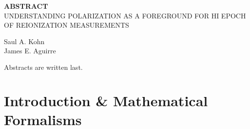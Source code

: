 \documentclass[12pt,twoside,openany]{book}
\newcommand{\singlespaced}{\renewcommand{\baselinestretch}{1}\normalfont}
\newcommand{\halfspaced}{\renewcommand{\baselinestretch}{1.5}\normalfont}
\newcommand{\tita}{UNDERSTANDING POLARIZATION AS A FOREGROUND FOR HI EPOCH OF REIONIZATION MEASUREMENTS}
\begin{document}
\newpage
\vspace*{.15 in}
\begin{center}
{\bf ABSTRACT}\\
\tita \\
\parskip=0.2in


Saul A. Kohn\\
James E. Aguirre
\end{center}
\noindent
Abstracts are written last.

\vspace*{\fill}

\newpage

\singlespaced
\tableofcontents

\newpage
{}
{}
\listoftables

\newpage
{}
\listoffigures


\halfspaced
\setlength{\parindent}{0.25in}



\mainmatter
\part{Introduction \& Mathematical Formalisms}
%
%
%
%
%
%
%
%

%
%
\end{document}
